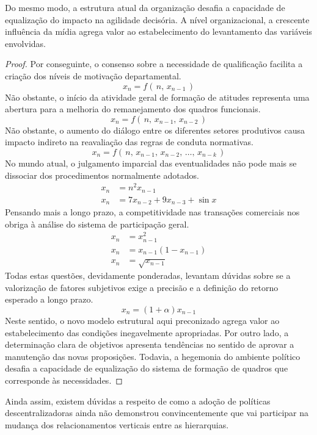 \documentclass[fleqn]{profmat-cefet}
\begin{document}
\begin{teorema}
  Do mesmo modo, a estrutura atual da organização desafia a capacidade de
  equalização do impacto na agilidade decisória. A nível organizacional, a
  crescente influência da mídia agrega valor ao estabelecimento do levantamento
  das variáveis envolvidas.
\end{teorema}
\begin{proof}
  Por conseguinte, o consenso sobre a necessidade de qualificação facilita a
  criação dos níveis de motivação departamental.
  \[ x_n = f(\,n,\,x_{n-1} \,)                            \]
  Não obstante, o início da atividade geral de formação de atitudes representa
  uma abertura para a melhoria do remanejamento dos quadros funcionais.
  \[ x_n = f(\,n,\,x_{n-1},\,x_{n-2} \,)                  \]
  Não obstante, o aumento do diálogo entre os diferentes setores produtivos
  causa impacto indireto na reavaliação das regras de conduta normativas.
  \[ x_n = f(\,n,\,x_{n-1},\,x_{n-2},\,\dots,\,x_{n-k}\,) \]
  No mundo atual, o julgamento imparcial das eventualidades não pode mais se
  dissociar dos procedimentos normalmente adotados.
  \begin{align*}
          x_n & = n^2x_{n-1}               \\
          x_n & = 7x_{n-2}+9x_{n-3}+\sin x
  \end{align*}
  Pensando mais a longo prazo, a competitividade nas transações comerciais nos
  obriga à análise do sistema de participação geral.
  \begin{align*}
          x_n & = x_{n-1}^2          \\
          x_n & = x_{n-1}(1-x_{n-1}) \\
          x_n & = \sqrt{x_{n-1}}
  \end{align*}
  Todas estas questões, devidamente ponderadas, levantam dúvidas sobre se a
  valorização de fatores subjetivos exige a precisão e a definição do retorno
  esperado a longo prazo.
  \[ x_n = (1+\alpha) x_{n-1} \]
  Neste sentido, o novo modelo estrutural aqui preconizado agrega valor ao
  estabelecimento das condições inegavelmente apropriadas.  Por outro lado, a
  determinação clara de objetivos apresenta tendências no sentido de aprovar a
  manutenção das novas proposições.  Todavia, a hegemonia do ambiente político
  desafia a capacidade de equalização do sistema de formação de quadros que
  corresponde às necessidades.
\end{proof}

Ainda assim, existem dúvidas a respeito de como a adoção de políticas
descentralizadoras ainda não demonstrou convincentemente que vai participar na
mudança dos relacionamentos verticais entre as hierarquias.
\end{document}

